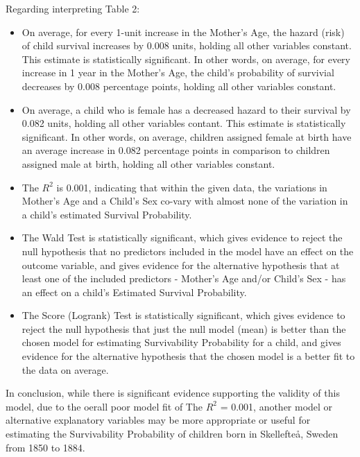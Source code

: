 \documentclass[12pt,letterpaper]{article}
\begin{document}
\noindent Regarding interpreting Table 2:
\begin{itemize}
	\item On average, for every 1-unit increase in the Mother's Age, the hazard (risk) of child survival increases by 0.008 units, holding all other variables constant. This estimate is statistically significant. In other words, on average, for every increase in 1 year in the Mother's Age, the child's probability of survivial decreases by 0.008 percentage points, holding all other variables constant.
	\item On average, a child who is female has a decreased hazard to their survival by 0.082 units, holding all other variables contant. This estimate is statistically significant. In other words, on average, children assigned female at birth have an average increase in 0.082 percentage points in comparison to children assigned male at birth, holding all other variables constant.
	\item The $R^2$ is 0.001, indicating that within the given data, the variations in Mother's Age and a Child's Sex co-vary with almost none of the variation in a child's estimated Survival Probability.
	\item The Wald Test is statistically significant, which gives evidence to reject the null hypothesis that no predictors included in the model have an effect on the outcome variable, and gives evidence for the alternative hypothesis that at least one of the included predictors - Mother's Age and/or Child's Sex - has an effect on a child's Estimated Survival Probability.
	\item The Score (Logrank) Test is statistically significant, which gives evidence to reject the null hypothesis that just the null model (mean) is better than the chosen model for estimating Survivability Probability for a child, and gives evidence for the alternative hypothesis that the chosen model is a better fit to the data on average.
\end{itemize}
\vspace{.25cm}
\noindent In conclusion, while there is significant evidence supporting the validity of this model, due to the oerall poor model fit of The $R^2$ = 0.001, another model or alternative explanatory variables may be more appropriate or useful for estimating the Survivability Probability of children born in Skellefteå, Sweden from 1850 to 1884.


\end{document}

